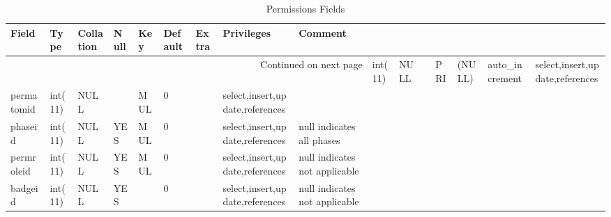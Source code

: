 \documentclass[tablesignature,landscape]{scrartcl}
\begin{document}
\begin{longtable}{|l|l|l|l|l|l|l|l|l|}
\caption{Permissions Fields} \label{tbl:permissionsfields}\\
\hline
 Field         &  Type     &  Collation  &  Null  &  Key  &  Default  &  Extra              &  Privileges                       &  Comment                       \\
\hline
\endhead
\hline\multicolumn{9}{r}{Continued on next page}\
\endfoot
\endlastfoot
\hline
 permissionid  &  int(11)  &  NULL       &        &  PRI  &   (NULL)  &  auto\_{}increment  &  select,insert,update,references  &                                 \\
 permatomid    &  int(11)  &  NULL       &        &  MUL  &        0  &                     &  select,insert,update,references  &                                 \\
 phaseid       &  int(11)  &  NULL       &  YES   &  MUL  &        0  &                     &  select,insert,update,references  &  null indicates all phases      \\
 permroleid    &  int(11)  &  NULL       &  YES   &  MUL  &        0  &                     &  select,insert,update,references  &  null indicates not applicable  \\
 badgeid       &  int(11)  &  NULL       &  YES   &       &        0  &                     &  select,insert,update,references  &  null indicates not applicable  \\
\hline
\end{longtable}
\end{document}
